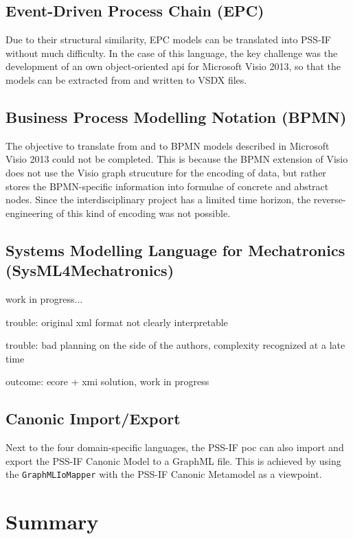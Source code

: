 \subsection{Event-Driven Process Chain (EPC)}

Due to their structural similarity, EPC models can be translated into PSS-IF without much difficulty. In the case of this language, the key challenge was the development of an own object-oriented \gls{api} for Microsoft Visio 2013, so that the models can be extracted from and written to VSDX files.

\subsection{Business Process Modelling Notation (BPMN)}

The objective to translate from and to BPMN models described in Microsoft Visio 2013 could not be completed. This is because the BPMN extension of Visio does not use the Visio graph strucuture for the encoding of data, but rather stores the BPMN-specific information into formulae of concrete and abstract nodes. Since the interdisciplinary project has a limited time horizon, the reverse-engineering of this kind of encoding was not possible. 

\subsection{Systems Modelling Language for Mechatronics (SysML4Mechatronics)}

\color{red} work in progress...\color{black}

trouble: original xml format not clearly interpretable

trouble: bad planning on the side of the authors, complexity recognized at a late time

outcome: ecore + xmi solution, \color{red}work in progress\color{black}

\subsection{Canonic Import/Export}

Next to the four domain-specific languages, the PSS-IF \gls{poc} can also import and export the PSS-IF Canonic Model to a GraphML file. This is achieved by using the \texttt{GraphMLIoMapper} with the PSS-IF Canonic Metamodel as a viewpoint.


\section{Summary}
\label{sec:results:summary}


